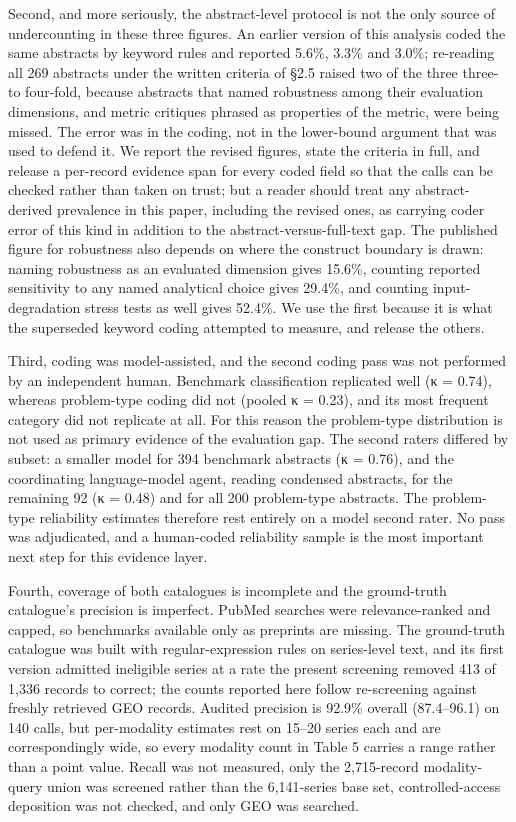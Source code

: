 \documentclass{article}
\begin{document}
Second, and more seriously, the abstract-level protocol is not the only
source of undercounting in these three figures. An earlier version of
this analysis coded the same abstracts by keyword rules and reported
5.6\%, 3.3\% and 3.0\%; re-reading all 269 abstracts under the written
criteria of §2.5 raised two of the three three- to four-fold, because
abstracts that named robustness among their evaluation dimensions, and
metric critiques phrased as properties of the metric, were being missed.
The error was in the coding, not in the lower-bound argument that was
used to defend it. We report the revised figures, state the criteria in
full, and release a per-record evidence span for every coded field so
that the calls can be checked rather than taken on trust; but a reader
should treat any abstract-derived prevalence in this paper, including
the revised ones, as carrying coder error of this kind in addition to
the abstract-versus-full-text gap. The published figure for robustness
also depends on where the construct boundary is drawn: naming robustness
as an evaluated dimension gives 15.6\%, counting reported sensitivity to
any named analytical choice gives 29.4\%, and counting input-degradation
stress tests as well gives 52.4\%. We use the first because it is what
the superseded keyword coding attempted to measure, and release the
others.

Third, coding was model-assisted, and the second coding pass was not
performed by an independent human. Benchmark classification replicated
well (κ = 0.74), whereas problem-type coding did not (pooled κ = 0.23),
and its most frequent category did not replicate at all. For this reason
the problem-type distribution is not used as primary evidence of the
evaluation gap. The second raters differed by subset: a smaller model
for 394 benchmark abstracts (κ = 0.76), and the coordinating
language-model agent, reading condensed abstracts, for the remaining 92
(κ = 0.48) and for all 200 problem-type abstracts. The problem-type
reliability estimates therefore rest entirely on a model second rater.
No pass was adjudicated, and a human-coded reliability sample is the
most important next step for this evidence layer.

Fourth, coverage of both catalogues is incomplete and the ground-truth
catalogue's precision is imperfect. PubMed searches were
relevance-ranked and capped, so benchmarks available only as preprints
are missing. The ground-truth catalogue was built with
regular-expression rules on series-level text, and its first version
admitted ineligible series at a rate the present screening removed 413
of 1,336 records to correct; the counts reported here follow
re-screening against freshly retrieved GEO records. Audited precision is
92.9\% overall (87.4--96.1) on 140 calls, but per-modality estimates
rest on 15--20 series each and are correspondingly wide, so every
modality count in Table 5 carries a range rather than a point value.
Recall was not measured, only the 2,715-record modality-query union was
screened rather than the 6,141-series base set, controlled-access
deposition was not checked, and only GEO was searched.
\end{document}
